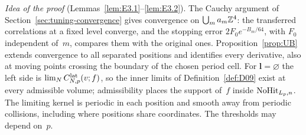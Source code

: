 \emph{Idea of the proof} (Lemmas~\ref{lem:E3.1}--\ref{lem:E3.2}). The Cauchy argument of Section~\ref{sec:tuning-convergence} gives convergence on $\bigcup_ma_m\mathbb{Z}^4$: the transferred correlations at a fixed level converge, and the stopping error $2F_0e^{-B_m/64}$, with $F_0$ independent of~$m$, compares them with the original ones. Proposition~\ref{prop:UB} extends convergence to all separated positions and identifies every derivative, also at moving points crossing the boundary of the chosen period cell.
For $\boldsymbol l=\varnothing$ the left side is $\lim_NC^{\mathrm{lat}}_{N,p}(v;f)$, so the inner limits of Definition~\ref{def:D09} exist at every admissible volume; admissibility places the support of~$f$ inside $\mathrm{NoHit}_{L_p,n}$. The limiting kernel is periodic in each position and smooth away from periodic collisions, including where positions share coordinates. The thresholds may depend on~$p$.
